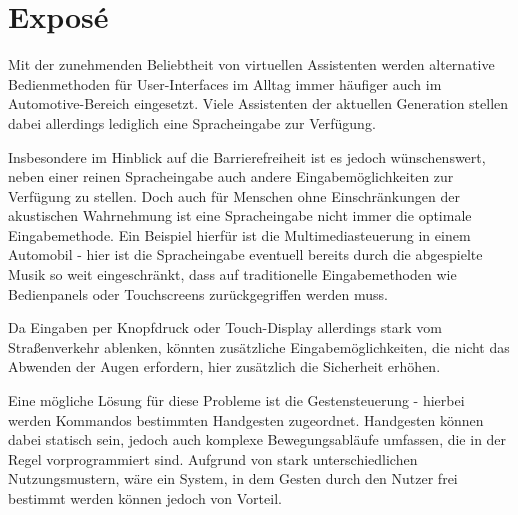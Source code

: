 \documentclass[12pt, a4paper]{book}
\begin{document}
\frontmatter
{}



\mainmatter
\cleardoublepage



\section{Exposé}

Mit der zunehmenden Beliebtheit von virtuellen Assistenten werden alternative Bedienmethoden für User-Interfaces im Alltag immer häufiger auch im Automotive-Bereich eingesetzt. Viele Assistenten der aktuellen Generation stellen dabei allerdings lediglich eine Spracheingabe zur Verfügung.

Insbesondere im Hinblick auf die Barrierefreiheit ist es jedoch wünschenswert, neben einer reinen Spracheingabe auch andere Eingabemöglichkeiten zur Verfügung zu stellen. Doch auch für Menschen ohne Einschränkungen der akustischen Wahrnehmung ist eine Spracheingabe nicht immer die optimale Eingabemethode. Ein Beispiel hierfür ist die Multimediasteuerung in einem Automobil - hier ist die Spracheingabe eventuell bereits durch die abgespielte Musik so weit eingeschränkt, dass auf traditionelle Eingabemethoden wie Bedienpanels oder Touchscreens zurückgegriffen werden muss. 

Da Eingaben per Knopfdruck oder Touch-Display allerdings stark vom Straßenverkehr ablenken, könnten zusätzliche Eingabemöglichkeiten, die nicht das Abwenden der Augen erfordern, hier zusätzlich die Sicherheit erhöhen.

Eine mögliche Lösung für diese Probleme ist die Gestensteuerung - hierbei werden Kommandos bestimmten Handgesten zugeordnet. Handgesten können dabei statisch sein, jedoch auch komplexe Bewegungsabläufe umfassen, die in der Regel vorprogrammiert sind. Aufgrund von stark unterschiedlichen Nutzungsmustern, wäre ein System, in dem Gesten durch den Nutzer frei bestimmt werden können jedoch von Vorteil. 
\end{document}
